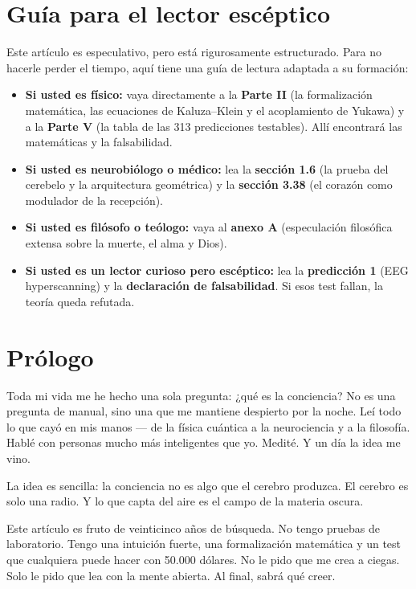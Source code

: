 \documentclass[11pt,a4paper]{article}
\begin{document}
\section*{Guía para el lector escéptico}
Este artículo es especulativo, pero está rigurosamente estructurado. Para no hacerle perder el tiempo, aquí tiene una guía de lectura adaptada a su formación:
\begin{itemize}
    \item \textbf{Si usted es físico:} vaya directamente a la \textbf{Parte II} (la formalización matemática, las ecuaciones de Kaluza--Klein y el acoplamiento de Yukawa) y a la \textbf{Parte V} (la tabla de las 313 predicciones testables). Allí encontrará las matemáticas y la falsabilidad.
    \item \textbf{Si usted es neurobiólogo o médico:} lea la \textbf{sección 1.6} (la prueba del cerebelo y la arquitectura geométrica) y la \textbf{sección 3.38} (el corazón como modulador de la recepción).
    \item \textbf{Si usted es filósofo o teólogo:} vaya al \textbf{anexo A} (especulación filosófica extensa sobre la muerte, el alma y Dios).
    \item \textbf{Si usted es un lector curioso pero escéptico:} lea la \textbf{predicción 1} (EEG hyperscanning) y la \textbf{declaración de falsabilidad}. Si esos test fallan, la teoría queda refutada.
\end{itemize}

\section*{Prólogo}
Toda mi vida me he hecho una sola pregunta: ¿qué es la conciencia? No es una pregunta de manual, sino una que me mantiene despierto por la noche. Leí todo lo que cayó en mis manos --- de la física cuántica a la neurociencia y a la filosofía. Hablé con personas mucho más inteligentes que yo. Medité. Y un día la idea me vino.

La idea es sencilla: la conciencia no es algo que el cerebro produzca. El cerebro es solo una radio. Y lo que capta del aire es el campo de la materia oscura.

Este artículo es fruto de veinticinco años de búsqueda. No tengo pruebas de laboratorio. Tengo una intuición fuerte, una formalización matemática y un test que cualquiera puede hacer con 50.000 dólares. No le pido que me crea a ciegas. Solo le pido que lea con la mente abierta. Al final, sabrá qué creer.
\end{document}
